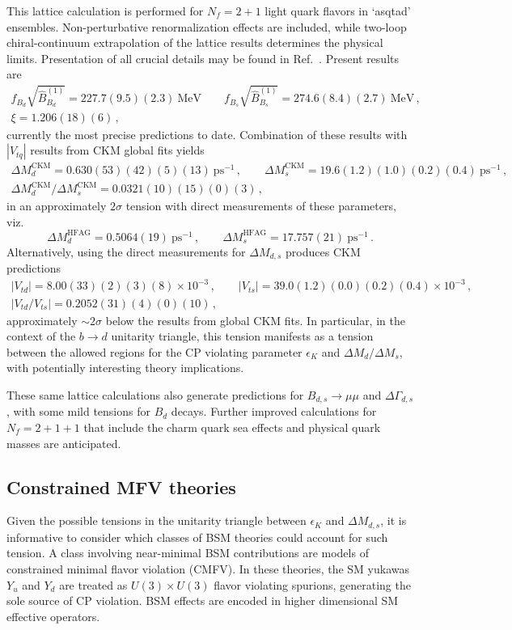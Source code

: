 This lattice calculation is performed for $N_f = 2+1$ light quark flavors in `asqtad' ensembles. Non-perturbative renormalization effects are included, while two-loop chiral-continuum extrapolation of the lattice results determines the physical limits. Presentation of all crucial details may be found in Ref.~\cite{Bazavov:2016nty}. Present results are
\begin{gather}
	f_{B_d}\sqrt{\hat{B}^{(1)}_{B_d}} = 227.7(9.5)(2.3)~\text{MeV} \qquad f_{B_s}\sqrt{\hat{B}^{(1)}_{B_s}} = 274.6(8.4)(2.7)~\text{MeV}\,,\nonumber\\
		\xi = 1.206(18)(6)\,,
\end{gather}
currently the most precise predictions to date. Combination of these results with $|V_{tq}|$ results from CKM global fits yields 
\begin{gather}
	\Delta M^{\text{CKM}}_d = 0.630(53)(42)(5)(13)~\text{ps}^{-1}\,, \qquad \Delta M^{\text{CKM}}_s = 19.6(1.2)(1.0)(0.2)(0.4)~\text{ps}^{-1}\,,\nonumber \\
	\Delta M^{\text{CKM}}_d/\Delta M^{\text{CKM}}_s = 0.0321(10)(15)(0)(3)\,,
\end{gather}
in an approximately $2\sigma$ tension with direct measurements of these parameters, viz.
\begin{equation}
	\Delta M^{\text{HFAG}}_d = 0.5064(19)~\text{ps}^{-1}\,,\qquad \Delta M^{\text{HFAG}}_s = 17.757(21)~\text{ps}^{-1}\,.
\end{equation}
Alternatively, using the direct measurements for $\Delta M_{d,s}$ produces CKM predictions
\begin{gather}
	|V_{td}| = 8.00(33)(2)(3)(8)\times 10^{-3}\,,\qquad |V_{ts}| = 39.0(1.2)(0.0)(0.2)(0.4)\times 10^{-3}\,,\nonumber\\
	|V_{td}/V_{ts}| = 0.2052(31)(4)(0)(10)\,,
\end{gather}
approximately $\sim2\sigma$ below the results from global CKM fits. In particular, in the context of the $b \to d$ unitarity triangle, this tension manifests as a tension between the allowed regions for the CP violating parameter $\epsilon_K$ and $\Delta M_{d}/\Delta M_s$, with potentially interesting theory implications. 

These same lattice calculations also generate predictions for $B_{d,s} \to \mu\mu$ and $\Delta\Gamma_{d,s}$, with some mild tensions for $B_d$ decays. Further improved calculations for $N_f = 2 + 1 + 1$ that include the charm quark sea effects and physical quark masses are anticipated.

\subsection{Constrained MFV theories}
Given the possible tensions in the unitarity triangle between $\epsilon_K$ and $\Delta M_{d,s}$, it is informative to consider which classes of BSM theories could account for such tension. A class involving near-minimal BSM contributions are models of constrained minimal flavor violation (CMFV). In these theories, the SM yukawas $Y_u$ and $Y_d$ are treated as $U(3)\times U(3)$ flavor violating spurions, generating the sole source of CP violation.  BSM effects are encoded in higher dimensional SM effective operators.

